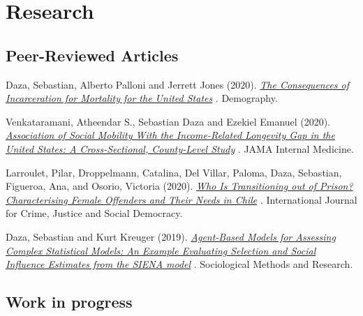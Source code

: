 \documentclass[10pt,letterpaper]{article}
\renewenvironment{itemize}{
  \begin{list}{}{
    \setlength{\leftmargin}{1.5em}
    \setlength{\itemsep}{0.25em}
    \setlength{\parskip}{0pt}
    \setlength{\parsep}{0.25em}
  }
}{
  \end{list}
}
\begin{document}
\section*{Research}

\subsection*{Peer-Reviewed Articles}

\begin{itemize}

\item Daza, Sebastian, Alberto Palloni and Jerrett Jones (2020).
  \textit{\href{https://rdcu.be/b278V}
  {The Consequences of Incarceration for Mortality for the United States}
  }.
  Demography.

\item Venkataramani, Atheendar S., Sebastian Daza and Ezekiel Emanuel (2020).
  \textit{
  \href{doi:10.1001/jamainternmed.2019.6532}
  {Association of Social Mobility With the Income-Related Longevity Gap in the United States: A Cross-Sectional, County-Level Study}
  }.
 JAMA Internal Medicine.


\item Larroulet, Pilar, Droppelmann, Catalina, Del Villar, Paloma, Daza, Sebastian, Figueroa, Ana, and Osorio, Victoria (2020).
    \textit{
  \href{https://www.crimejusticejournal.com/article/view/1467}
  {Who Is Transitioning out of Prison? Characterising Female Offenders and Their Needs in Chile}
  }.
International Journal for Crime, Justice and Social Democracy.

 \item Daza, Sebastian and Kurt Kreuger (2019).
  \textit{
  \href{https://doi.org/10.1177/0049124119826147}
  {Agent-Based Models for Assessing Complex Statistical Models: An Example Evaluating Selection and Social Influence Estimates from the SIENA model}
  }.
 Sociological Methods and Research.


\end{itemize}

\subsection*{Work in progress}
\end{document}
